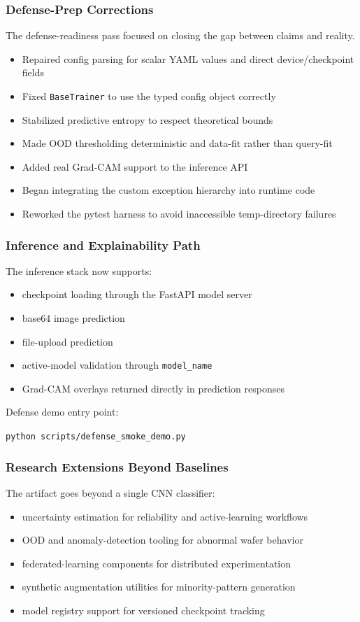 \documentclass{beamer}
\begin{document}
\begin{frame}
  \frametitle{Defense-Prep Corrections}
  The defense-readiness pass focused on closing the gap between claims and reality.

  \begin{itemize}
    \item Repaired config parsing for scalar YAML values and direct device/checkpoint fields
    \item Fixed \texttt{BaseTrainer} to use the typed config object correctly
    \item Stabilized predictive entropy to respect theoretical bounds
    \item Made OOD thresholding deterministic and data-fit rather than query-fit
    \item Added real Grad-CAM support to the inference API
    \item Began integrating the custom exception hierarchy into runtime code
    \item Reworked the pytest harness to avoid inaccessible temp-directory failures
  \end{itemize}
\end{frame}

\begin{frame}
  \frametitle{Inference and Explainability Path}
  The inference stack now supports:

  \begin{itemize}
    \item checkpoint loading through the FastAPI model server
    \item base64 image prediction
    \item file-upload prediction
    \item active-model validation through \texttt{model\_name}
    \item Grad-CAM overlays returned directly in prediction responses
  \end{itemize}

  \vspace{0.4cm}
  Defense demo entry point:

  \begin{center}
    \texttt{python scripts/defense\_smoke\_demo.py}
  \end{center}
\end{frame}

\begin{frame}
  \frametitle{Research Extensions Beyond Baselines}
  The artifact goes beyond a single CNN classifier:

  \begin{itemize}
    \item uncertainty estimation for reliability and active-learning workflows
    \item OOD and anomaly-detection tooling for abnormal wafer behavior
    \item federated-learning components for distributed experimentation
    \item synthetic augmentation utilities for minority-pattern generation
    \item model registry support for versioned checkpoint tracking
  \end{itemize}
\end{frame}
\end{document}

